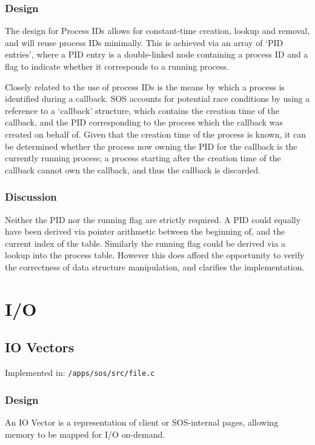 \documentclass[a4paper,12pt]{article}
\begin{document}
\subsubsection{Design}
The design for Process IDs allows for constant-time creation, lookup and
removal, and will reuse process IDs minimally.  This is achieved via an array
of `PID entries', where a PID entry is a double-linked node containing a
process ID and a flag to indicate whether it corresponds to a running process.

Closely related to the use of process IDs is the means by which a process is
identified during a callback.  SOS accounts for potential race conditions by
using a reference to a `callback' structure, which contains the creation time
of the callback, and the PID corresponding to the process which the callback
was created on behalf of.  Given that the creation time of the process is
known, it can be determined whether the process now owning the PID for the
callback is the currently running process; a process starting after the
creation time of the callback cannot own the callback, and thus the callback
is discarded.

\subsubsection{Discussion}
Neither the PID nor the running flag are strictly required.  A PID could
equally have been derived via pointer arithmetic between the beginning of,
and the current index of the table.  Similarly the running flag could be
derived via a lookup into the process table.  However this does afford the
opportunity to verify the correctness of data structure manipulation, and
clarifies the implementation.

\section{I/O}
\subsection{IO Vectors}
Implemented in: \texttt{/apps/sos/src/file.c}

\subsubsection{Design}
An IO Vector is a representation of client or SOS-internal pages, allowing
memory to be mapped for I/O on-demand.
\end{document}
